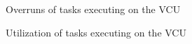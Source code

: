 \begin{figure}[htb]
    \centering
    
    \caption{Overruns of tasks executing on the VCU}
    \label{fig:task_overrun}
\end{figure}

\begin{figure}[htb]
    \centering
    
    \caption{Utilization of tasks executing on the VCU}
    \label{fig:task_util}
\end{figure}